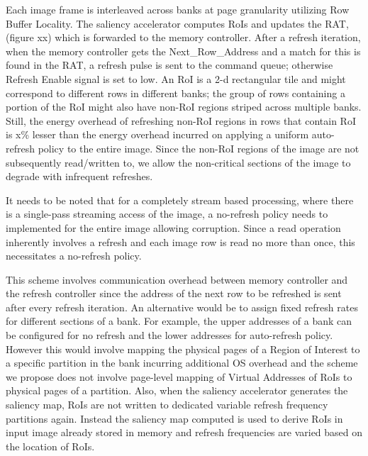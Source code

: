 Each image frame is interleaved across banks at page granularity utilizing Row Buffer Locality. The saliency accelerator computes RoIs and updates the RAT,(figure xx) which is forwarded to the memory controller. After a refresh iteration, when the memory controller gets the Next\_Row\_Address and a match for this is found in the RAT, a refresh pulse is sent to the command queue; otherwise Refresh Enable signal is set to low. An RoI is a 2-d rectangular tile and might correspond to different rows in different banks; the group of rows containing a portion of the RoI might also have non-RoI regions striped across multiple banks. Still, the energy overhead of refreshing non-RoI regions in rows that contain RoI is x\% lesser than the energy overhead incurred on applying a uniform auto-refresh policy to the entire image. Since the non-RoI regions of the image are not subsequently read/written to, we allow the non-critical sections of the image to degrade with infrequent refreshes.  

It needs to be noted that for a completely stream based processing, where there is a single-pass streaming access of the image, a no-refresh policy needs to implemented for the entire image allowing corruption. Since a read operation inherently involves a refresh and each image row is read no more than once, this necessitates a no-refresh policy. 

This scheme involves communication overhead between memory controller and the refresh controller since the address of the next row to be refreshed is sent after every refresh iteration. An alternative would be to assign fixed refresh rates for different sections of a bank. For example, the upper addresses of a bank can be configured for no refresh and the lower addresses for auto-refresh policy. However this would involve mapping the physical pages of a Region of Interest to a specific partition in the bank incurring additional OS overhead and the scheme we propose does not involve page-level mapping of Virtual Addresses of RoIs to physical pages of a partition. Also, when the saliency accelerator generates the saliency map, RoIs are not written to dedicated variable refresh frequency partitions again. Instead the saliency map computed is used to derive RoIs in input image already stored in memory and refresh frequencies are varied based on the location of RoIs. 



